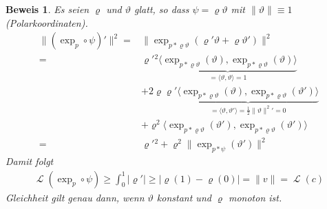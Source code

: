 \documentclass[paper=A4, twoside, chapterprefix=true, bibliography=totoc, headsepline]{scrbook}
\let\temp\phi
\let\phi\varphi
\let\varphi\temp
\let\temp\theta
\let\theta\vartheta
\let\vartheta\temp
\let\temp\epsilon
\let\epsilon\varepsilon
\let\varepsilon\temp
\let\temp\rho
\let\rho\varrho
\let\varrho\temp
\DeclareMathOperator{\calL}{\mathcal{L}}
\theoremstyle{plain}
\theoremstyle{nonumberplain}
\newtheorem{bew}{Beweis}
\theoremstyle{empty}
\theoremstyle{break}
\begin{document}
\begin{bew}
  Es seien $\rho$ und $\theta$ glatt, so dass $\psi = \rho \theta$ mit $\|\theta\| \equiv 1$ (Polarkoordinaten).
  \begin{align*}
    \|(\exp_p \circ \psi)'\|^2 ={}& \|\exp_{p*\rho\theta} ( \rho' \theta + \rho \theta') \|^2 \\
    ={}& {\rho'}{^2} \underbrace{\langle \exp_{p*\rho\theta} (\theta), \exp_{p*\rho\theta} (\theta) \rangle}_{= \langle \theta, \theta \rangle = 1} \\
    & + 2\rho\rho' \underbrace{\langle \exp_{p*\rho\theta} (\theta), \exp_{p*\rho\theta} (\theta') \rangle}_{= \langle \theta, \theta' \rangle = \frac{1}{2} \|\theta\|^2{'} = 0} \\
    & + \rho^2 \langle \exp_{p*\rho\theta} (\theta'), \exp_{p*\rho\theta} (\theta') \rangle \\
    ={}& {\rho'}{^2} + \rho^2 \| \exp_{p*\psi}(\theta') \|^2
  \end{align*}
  Damit folgt
  \begin{align*}
    \calL(\exp_p \circ \psi) \ge \int_0^1 | \rho' | \ge | \rho(1) - \rho(0) | = \|v\| = \calL(c)
  \end{align*}
  Gleichheit gilt genau dann, wenn $\theta$ konstant und $\rho$ monoton ist.
\end{bew}
\end{document}
